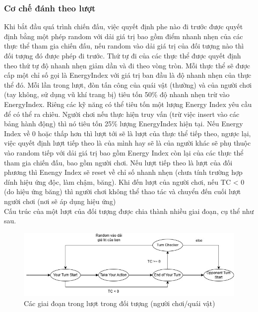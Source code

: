 \subsubsection{Cơ chế đánh theo lượt}
\hspace*{0.5cm} Khi bắt đầu quá trình chiến đấu, việc quyết định phe nào đi trước được quyết định bằng một phép random với dải giá trị bao gồm điểm nhanh nhẹn của các thực thể tham gia chiến đấu, nếu random vào dải giá trị của đối tượng nào thì đối tượng đó được phép đi trước. Thứ tự đi của các thực thể được quyết định theo thứ tự độ nhanh nhẹn giảm dần và đi theo vòng tròn. Mỗi thực thể sẽ được cấp một chỉ số gọi là EnergyIndex với giá trị ban đầu là độ nhanh nhẹn của thực thể đó. Mỗi lần trong lượt, đòn tấn công của quái vật (thường) và của người chơi (tay không, sử dụng vũ khí trang bị) tiêu tốn 50\% độ nhanh nhẹn trừ vào EnergyIndex. Riêng các kỹ năng có thể tiêu tốn một lượng Energy Index yêu cầu để có thể ra chiêu. Người chơi nếu thực hiện truy vấn (trừ việc insert vào các bảng hành động) thì nó tiêu tốn 25\% lượng EnergyIndex hiện tại. Nếu Energy Index về 0 hoặc thấp hơn thì lượt tới sẽ là lượt của thực thể tiếp theo, ngược lại, việc quyết định lượt tiếp theo là của mình hay sẽ là của người khác sẽ phụ thuộc vào random tiếp với dải giá trị bao gồm Energy Index còn lại của các thực thể tham gia chiến đấu, bao gồm người chơi. Nếu lượt tiếp theo là lượt của đối phương thì Enengy Index sẽ reset về chỉ số nhanh nhẹn (chưa tính trường hợp dính hiệu ứng độc, làm chậm, băng). Khi đến lượt của người chơi, nếu TC < 0 (do hiệu ứng băng) thì người chơi không thể thao tác và chuyển đến cuối lượt người chơi (nơi sẽ áp dụng hiệu ứng)\\
\hspace*{0.5cm} Cấu trúc của một lượt của đối tượng được chia thành nhiều giai đoạn, cụ thể như sau. 
\begin{figure}[H]
	\centering	\includegraphics[width=\textwidth]{Images/turnphases.jpg}
	\vspace{0.5cm}
	\caption{Các giai đoạn trong lượt trong đối tượng (người chơi/quái vật)}
\end{figure}
